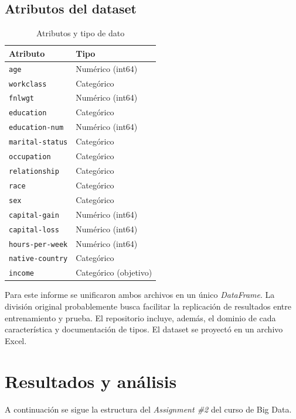 \documentclass[12pt,a4paper]{article}
\begin{document}
\subsection{Atributos del dataset}

\begin{table}[H]
  \centering
  \begin{tabular}{@{}ll@{}}
    \toprule
    \textbf{Atributo} & \textbf{Tipo} \\ \midrule
    \texttt{age}             & Numérico (int64) \\
    \texttt{workclass}       & Categórico \\
    \texttt{fnlwgt}          & Numérico (int64) \\
    \texttt{education}       & Categórico \\
    \texttt{education-num}   & Numérico (int64) \\
    \texttt{marital-status}  & Categórico \\
    \texttt{occupation}      & Categórico \\
    \texttt{relationship}    & Categórico \\
    \texttt{race}            & Categórico \\
    \texttt{sex}             & Categórico \\
    \texttt{capital-gain}    & Numérico (int64) \\
    \texttt{capital-loss}    & Numérico (int64) \\
    \texttt{hours-per-week}  & Numérico (int64) \\
    \texttt{native-country}  & Categórico \\
    \texttt{income}          & Categórico (objetivo) \\ \bottomrule
  \end{tabular}
  \caption{Atributos y tipo de dato}
  \label{tab:adult_attributes}
\end{table}

Para este informe se unificaron ambos archivos en un único \emph{DataFrame}. La división 
original probablemente busca facilitar la replicación de resultados entre entrenamiento y 
prueba. El repositorio incluye, además, el dominio de cada característica y documentación 
de tipos. El dataset se proyectó en un archivo Excel.

\section{Resultados y análisis}
A continuación se sigue la estructura del \textit{Assignment \#2} del curso de Big Data.
\end{document}
